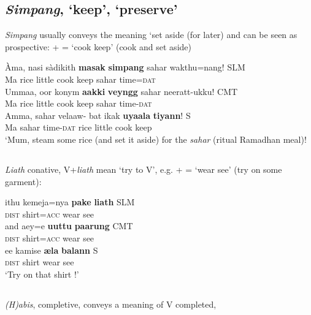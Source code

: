 \subsection{\textit{Simpang}, `keep', `preserve'}
{\em Simpang} usually conveys the meaning `set aside (for later) and can be seen as prospective:
 +  = `cook keep' (cook and set aside)

\ea\label{jaffar:ex:49}
\ea
\gll Àma, nasi sàdikith \textbf{masak} \textbf{simpang} sahar wakthu=nang! SLM \\
 Ma rice little cook keep sahar time=\textsc{dat}  \\
\ex%
\gll Ummaa, {\textesh}oor kony{\E}m \textbf{aakki} \textbf{veyngg{\E}} sahar neeratt-ukku! CMT \\
 Ma rice little  cook keep sahar time-\textsc{dat}  \\
\ex%
\gll Amma, sahar velaaw{\E}-{\textrtailt}{\E} bat {\textrtailt}ikak \textbf{uyaala} \textbf{tiyann{\E}}! S \\
 Ma sahar time-\textsc{dat} rice little cook keep\\
`Mum, steam some rice (and set it aside) for the \textit{sahar} (ritual Ramadhan meal)!
\z
\z

\subsection{}
{\em Liath} conative, V+\textit{liath} mean `try to V', e.g.
 +  = `wear see' (try on some garment):

\ea
\ea\label{jaffar:ex:52}
\gll ithu kemeja=nya \textbf{pake} \textbf{liath} SLM \\
 \textsc{dist} shirt=\textsc{acc}   wear see\\
\ex%
\gll and{\E} {\textesh}a{\textrtailt}{\textrtailt}ey=e \textbf{u{\dz}uttu} \textbf{paarung{\E}} CMT \\
 \textsc{dist} shirt=\textsc{acc}   wear see\\
\ex%
\gll ee kamise \textbf{{\ae}{\und}{\E}la} \textbf{balann{\E}} S \\
 \textsc{dist} shirt   wear see\\
 `Try on that shirt !'
\z
\z

\subsection{}
{\em (H)abis}, completive, conveys a meaning of V completed,

